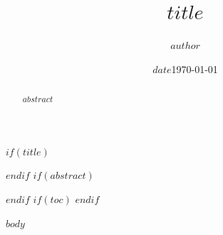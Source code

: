 \documentclass[$if(cjk)$scheme=chinese,$else$scheme=plain,$endif$12pt, a4paper]{ctexart}
\title{$title$}
\author{$author$}
\date{$date$}
\date{\today}
\begin{document}
$if(title)$
\maketitle
$endif$
$if(abstract)$
\begin{abstract}
$abstract$
\end{abstract}
$endif$
$if(toc)$
\tableofcontents
\newpage
$endif$

$body$
\end{document}
